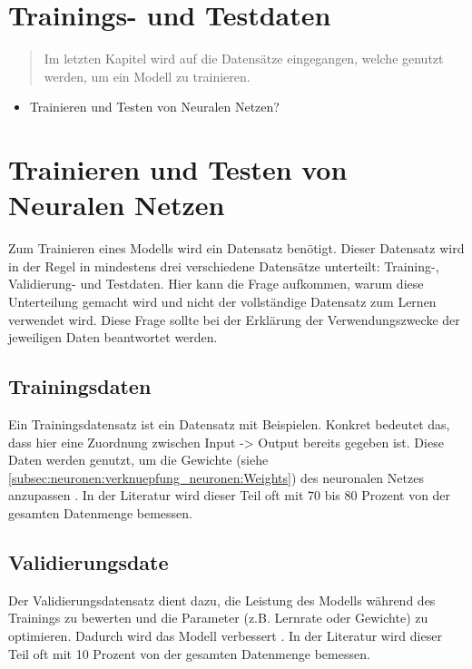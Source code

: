 \newpage
\thispagestyle{empty}
\section{Trainings- und Testdaten}\label{sec:training_testdaten}   
\begin{tcolorbox}[title={Inhalte von \textit{Trainings- und Testdaten}}]
  \begin{quotation}\noindent
    Im letzten Kapitel wird auf die Datensätze eingegangen, welche genutzt werden, um ein Modell zu trainieren.
  \end{quotation}
  \begin{itemize}
    \item Trainieren und Testen von Neuralen Netzen?


  \end{itemize}
\end{tcolorbox}

\section{Trainieren und Testen von Neuralen Netzen}\label{sec:trainingsdaten}   
Zum Trainieren eines Modells wird ein Datensatz benötigt. Dieser Datensatz wird in der Regel in mindestens drei verschiedene Datensätze unterteilt: Training-, Validierung- und Testdaten.
Hier kann die Frage aufkommen, warum diese Unterteilung gemacht wird und nicht der vollständige Datensatz zum Lernen verwendet wird. 
Diese Frage sollte bei der Erklärung der Verwendungszwecke der jeweiligen Daten beantwortet werden.

\subsection{Trainingsdaten}
Ein Trainingsdatensatz ist ein Datensatz mit Beispielen. Konkret bedeutet das, dass hier eine Zuordnung zwischen Input -> Output bereits gegeben ist.
Diese Daten werden genutzt, um die Gewichte (siehe \ref*{subsec:neuronen:verknuepfung_neuronen:Weights}) des neuronalen Netzes anzupassen \cite[Seite 2ff]{CA18}.
In der Literatur wird dieser Teil oft mit 70 bis 80 Prozent von der gesamten Datenmenge bemessen.

\subsection{Validierungsdate}
Der Validierungsdatensatz dient dazu, die Leistung des Modells während des Trainings zu bewerten und die Parameter (z.B. Lernrate oder Gewichte) zu optimieren. 
Dadurch wird das Modell verbessert \cite[Seite 20]{CA18}.
In der Literatur wird dieser Teil oft mit 10 Prozent von der gesamten Datenmenge bemessen.

